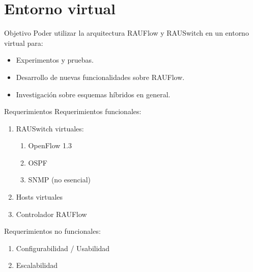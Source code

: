 \documentclass[xcolor=svgnames]{beamer}
\begin{document}
\section{Entorno virtual}

\begin{frame}{}
	\tableofcontents[currentsection]
\end{frame}

\begin{frame}{Objetivo}
	Poder utilizar la arquitectura RAUFlow y RAUSwitch en un entorno virtual para:
	\begin{itemize}
		\item Experimentos y pruebas.
		\item Desarrollo de nuevas funcionalidades sobre RAUFlow.
		\item Investigación sobre esquemas híbridos en general.
	\end{itemize}
\end{frame}

\begin{frame}{Requerimientos}
	Requerimientos funcionales:
	\begin{enumerate}
		\item RAUSwitch virtuales:
		\begin{enumerate}
			\item OpenFlow 1.3
			\item OSPF
			\item SNMP (no esencial)
		\end{enumerate}
		\item Hosts virtuales
		\item Controlador RAUFlow
	\end{enumerate}
	\pause
	Requerimientos no funcionales:
	\begin{enumerate}
		\item Configurabilidad / Usabilidad
		\item Escalabilidad
	\end{enumerate}
\end{frame}
\end{document}
